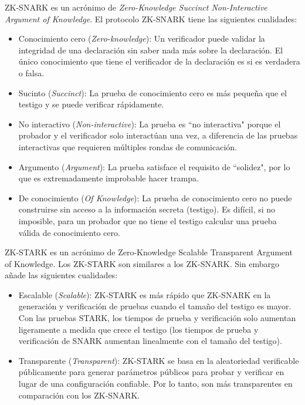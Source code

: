 ZK-SNARK es un acrónimo de \textit{Zero-Knowledge Succinct Non-Interactive Argument of Knowledge}. El protocolo ZK-SNARK tiene las siguientes cualidades:
\begin{itemize}
    \item Conocimiento cero (\emph{Zero-knowledge}): Un verificador puede validar la integridad de una declaración sin saber nada más sobre la declaración. El único conocimiento que tiene el verificador de la declaración es si es verdadera o falsa.

     \item Sucinto (\emph{Succinct}): La prueba de conocimiento cero es más pequeña que el testigo y se puede verificar rápidamente.

     \item No interactivo (\emph{Non-interactive}): La prueba es ``no interactiva" porque el probador y el verificador solo interactúan una vez, a diferencia de las pruebas interactivas que requieren múltiples rondas de comunicación.

     \item Argumento (\emph{Argument}): La prueba satisface el requisito de ``solidez", por lo que es extremadamente improbable hacer trampa.

     \item De conocimiento (\emph{Of Knowledge}): La prueba de conocimiento cero no puede construirse sin acceso a la información secreta (testigo). Es difícil, si no imposible, para un probador que no tiene el testigo calcular una prueba válida de conocimiento cero.
\end{itemize}

ZK-STARK es un acrónimo de Zero-Knowledge Scalable Transparent Argument of Knowledge. Los ZK-STARK son similares a los ZK-SNARK. Sin embargo añade las siguientes cualidades:
\begin{itemize}
    \item Escalable (\emph{Scalable}): ZK-STARK es más rápido que ZK-SNARK en la generación y verificación de pruebas cuando el tamaño del testigo es mayor. Con las pruebas STARK, los tiempos de prueba y verificación solo aumentan ligeramente a medida que crece el testigo (los tiempos de prueba y verificación de SNARK aumentan linealmente con el tamaño del testigo).
     
     \item Transparente (\emph{Transparent}): ZK-STARK se basa en la aleatoriedad verificable públicamente para generar parámetros públicos para probar y verificar en lugar de una configuración confiable. Por lo tanto, son más transparentes en comparación con los ZK-SNARK.
\end{itemize}


